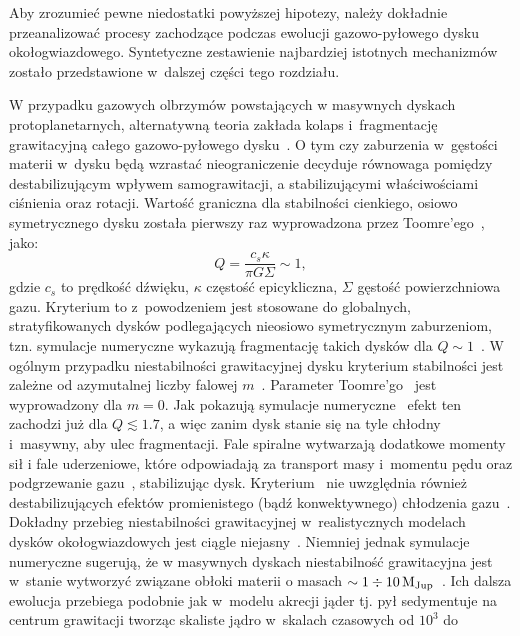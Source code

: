 \par Aby zrozumieć pewne niedostatki powyższej hipotezy, należy
dokładnie przeanalizować procesy zachodzące podczas ewolucji gazowo-pyłowego
dysku okołogwiazdowego. Syntetyczne zestawienie najbardziej istotnych
mechanizmów zostało przedstawione w~dalszej części tego rozdziału.

\par W przypadku gazowych olbrzymów powstających w masywnych dyskach
protoplanetarnych, alternatywną teoria zakłada kolaps i~fragmentację
grawitacyjną całego gazowo-pyłowego dysku~\cite{Boss97}. O tym czy zaburzenia
w~gęstości materii w~dysku będą wzrastać nieograniczenie decyduje równowaga
pomiędzy destabilizującym wpływem samograwitacji, a stabilizującymi
właściwościami ciśnienia oraz rotacji.  Wartość graniczna dla stabilności
cienkiego, osiowo symetrycznego dysku została pierwszy raz wyprowadzona przez
Toomre'ego~\cite{T64}, jako:
%
\begin{equation}
   Q = \frac{c_s\kappa}{\pi G \Sigma}\sim 1,
   \label{eq:toomre}
\end{equation}
%
gdzie $c_s$ to prędkość dźwięku, $\kappa$ częstość epicykliczna, $\Sigma$
gęstość powierzchniowa gazu. Kryterium to z~powodzeniem jest stosowane do
globalnych, stratyfikowanych dysków podlegających nieosiowo symetrycznym
zaburzeniom, tzn. symulacje numeryczne wykazują fragmentację takich dysków dla
$Q\sim 1$~\cite{NBAA98}. W ogólnym przypadku niestabilności grawitacyjnej dysku
kryterium stabilności jest zależne od azymutalnej liczby falowej
$m$~\cite{BT87}. Parameter Toomre'go~ jest wyprowadzony dla
$m=0$. Jak pokazują symulacje numeryczne~\cite{Duris07} efekt ten zachodzi już
dla $Q\lesssim 1.7$, a więc zanim dysk stanie się na tyle chłodny i~masywny, aby
ulec fragmentacji. Fale spiralne wytwarzają dodatkowe momenty sił i fale
uderzeniowe, które odpowiadają za transport masy i~momentu pędu oraz
podgrzewanie gazu~\cite{YC85}, stabilizując dysk. Kryterium~ nie
uwzględnia również destabilizujących efektów promienistego (bądź konwektywnego)
chłodzenia gazu~\cite{BMD06}. Dokładny przebieg niestabilności grawitacyjnej
w~realistycznych modelach dysków okołogwiazdowych jest ciągle
niejasny~\cite{MB11, LC11}. Niemniej jednak symulacje numeryczne sugerują, że w
masywnych dyskach niestabilność grawitacyjna jest w~stanie wytworzyć związane
obłoki materii o masach $\sim 1\div 10\hbox{$\mathrm{\thinspace M_{\textrm{Jup}}}$}$~\cite{BHM10, FR11}. Ich dalsza
ewolucja przebiega podobnie jak w~modelu akrecji jąder tj. pył sedymentuje na
centrum grawitacji tworząc skaliste jądro w~skalach czasowych od $10^3$ do
